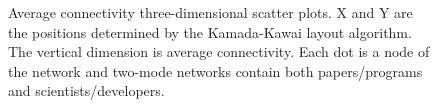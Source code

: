 \begin{figure}[p]
\hspace{.01in}

\caption[Average connectivity three-dimensional scatter plots.]{Average connectivity three-dimensional scatter plots. X and Y are the positions determined by the Kamada-Kawai layout algorithm. The vertical dimension is average connectivity. Each dot is a node of the network and two-mode networks contain both papers/programs and scientists/developers.}
\label{fig:scatter3d}
\end{figure}

